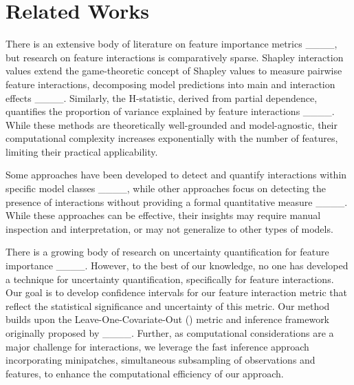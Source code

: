 \section{Related Works}
There is an extensive body of literature on feature importance metrics ____, but research on feature interactions is comparatively sparse. Shapley interaction values extend the game-theoretic concept of Shapley values to measure pairwise feature interactions, decomposing model predictions into main and interaction effects ____. Similarly, the H-statistic, derived from partial dependence, quantifies the proportion of variance explained by feature interactions ____. While these methods are theoretically well-grounded and model-agnostic, their computational complexity increases exponentially with the number of features, limiting their practical applicability.


Some approaches have been developed to detect and quantify interactions within specific model classes ____, while other approaches focus on detecting the presence of interactions without providing a formal quantitative measure ____. While these approaches can be effective, their insights may require manual inspection and interpretation, or may not generalize to other types of models. 

There is a growing body of research on uncertainty quantification for feature importance ____. However, to the best of our knowledge, no one has developed a technique for uncertainty quantification, specifically for feature interactions. Our goal is to develop confidence intervals for our feature interaction metric that reflect the statistical significance and uncertainty of this metric. Our method builds upon the Leave-One-Covariate-Out (\loco) metric and inference framework originally proposed by ____. 
Further, as computational considerations are a major challenge for interactions, we leverage the fast inference approach incorporating minipatches, simultaneous subsampling of observations and features, to enhance the computational efficiency of our approach.